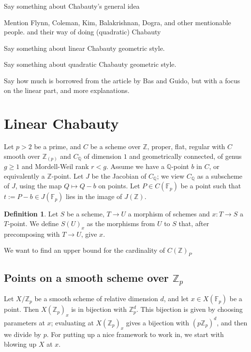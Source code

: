 \documentclass{article}
\newcommand{\Z}{\mathbb{Z}}
\newcommand{\Q}{\mathbb{Q}}
\newcommand{\F}{\mathbb{F}}
\renewcommand{\angle}[1]{\hspace{-2pt}\left\langle #1 \right\rangle}
\theoremstyle{plain}
\theoremstyle{definition}
\newtheorem{defn}[thm]{Definition} %
\theoremstyle{remark}
\begin{document}
Say something about Chabauty's general idea

Mention Flynn, Coleman, Kim, Balakrishnan, Dogra, and other mentionable people. and their way of doing (quadratic) Chabauty

Say something about linear Chabauty geometric style.

Say something about quadratic Chabauty geometric style.

Say how much is borrowed from the article by Bas and Guido, but with a focus on the linear part, and more explanations.

\newpage
\section{Linear Chabauty}
Let $p>2$ be a prime, and $C$ be a scheme over $\Z$, proper, flat, regular with $C$ smooth over $\Z_{(p)}$ and $C_\Q$ of dimension $1$ and geometrically connected, of genus $g \geq 1$ and Mordell-Weil rank $r < g$. Assume we have a $\Q$-point $b$ in $C$, or equivalently a $\Z$-point. Let $J$ be the Jacobian of $C_\Q$; we view $C_\Q$ as a subscheme of $J$, using the map $Q \mapsto Q - b$ on points. Let $P \in C(\F_p)$ be a point such that $t := P - b \in J(\F_p)$ lies in the image of $J(\Z)$.

\begin{defn}
Let $S$ be a scheme, $T \to U$ a morphism of schemes and $x : T \to S$ a $T$-point. We define $S(U)_x$ as the morphisms from $U$ to $S$ that, after precomposing with $T \to U$, give $x$.
\end{defn}

We want to find an upper bound for the cardinality of $C(\Z)_P$

\subsection{Points on a smooth scheme over \texorpdfstring{$\Z_p$}{Z\_p}}
\label{subs:smoothzppoints}
Let $X/\Z_p$ be a smooth scheme of relative dimension $d$, and let $x \in X(\F_p)$ be a point. Then $X(\Z_p)_x$ is in bijection with $\Z_p^d$. This bijection is given by choosing parameters at $x$; evaluating at $X(\Z_p)_x$ gives a bijection with $(p\Z_p)^d$, and then we divide by $p$. For putting up a nice framework to work in, we start with blowing up $X$ at $x$.
\end{document}
